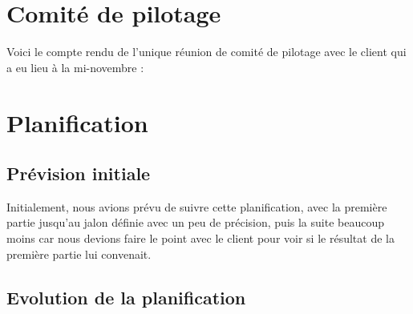\documentclass[11pt]{report}
\begin{document}
\section{Comité de pilotage}
Voici le compte rendu de l'unique réunion de comité de pilotage avec le client
qui a eu lieu à la mi-novembre : 
 \begin{landscape}
   
\end{landscape}
\clearpage

\newpage
\section{Planification}
\subsection{Prévision initiale}
Initialement, nous avions prévu de suivre cette planification, avec la
première partie jusqu'au jalon définie avec un peu de précision, puis la suite
beaucoup moins car nous devions faire le point avec le client pour voir si le
résultat de la première partie lui convenait.
\par

 \begin{landscape}
   
\end{landscape}
\clearpage

\subsection{Evolution de la planification}
\end{document}
